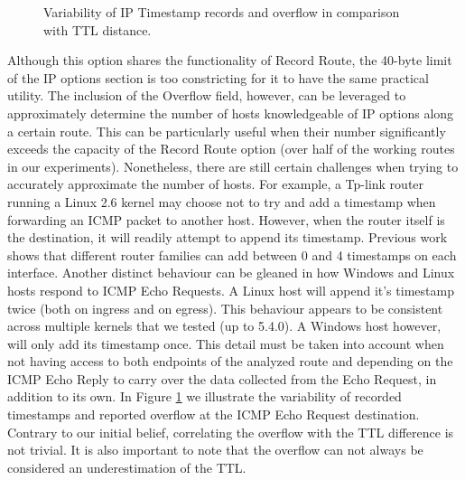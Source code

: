 \begin{figure}[htb]
    \centering
    
    \caption{Variability of IP Timestamp records and overflow in comparison with TTL distance.}
    \label{extend:ops:fig:ttl-ovf}
\end{figure}

Although this option shares the functionality of Record Route, the 40-byte limit of the IP options section is too constricting for it to have the same practical utility. The inclusion of the Overflow field, however, can be leveraged to approximately determine the number of hosts knowledgeable of IP options along a certain route. This can be particularly useful when their number significantly exceeds the capacity of the Record Route option (over half of the working routes in our experiments). Nonetheless, there are still certain challenges when trying to accurately approximate the number of hosts. For example, a Tp-link router running a Linux 2.6 kernel may choose not to try and add a timestamp when forwarding an ICMP packet to another host. However, when the router itself is the destination, it will readily attempt to append its timestamp. Previous work \cite{marchetta2017measuring} shows that different router families can add between 0 and 4 timestamps on each interface. Another distinct behaviour can be gleaned in how Windows and Linux hosts respond to ICMP Echo Requests. A Linux host will append it's timestamp twice (both on ingress and on egress). This behaviour appears to be consistent across multiple kernels that we tested (up to 5.4.0). A Windows host however, will only add its timestamp once. This detail must be taken into account when not having access to both endpoints of the analyzed route and depending on the ICMP Echo Reply to carry over the data collected from the Echo Request, in addition to its own. In Figure \ref{extend:ops:fig:ttl-ovf} we illustrate the variability of recorded timestamps and reported overflow at the ICMP Echo Request destination. Contrary to our initial belief, correlating the overflow with the TTL difference is not trivial. It is also important to note that the overflow can not always be considered an underestimation of the TTL.



